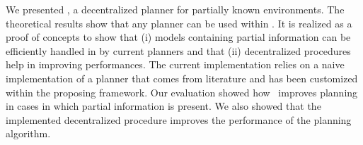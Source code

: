 We presented  \toolName, a  decentralized planner for partially known environments.
The theoretical results show that any planner can be used within \toolName. %
It is realized as a proof of concepts to show that (i) models containing partial information can be efficiently handled in by current planners and that (ii) decentralized procedures help in improving performances.
The current implementation relies on a naive implementation of a planner that comes from literature and has been customized within the proposing framework.
Our evaluation showed how  \toolName\ improves planning in cases in which partial information is present.
We also showed that the implemented decentralized procedure improves the performance of the planning algorithm.

